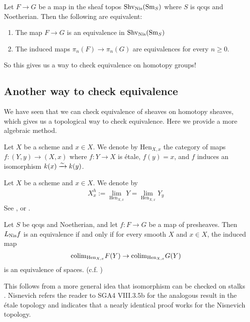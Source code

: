 \documentclass[11pt]{amsart}
\providecommand{\Hen}{\mathrm{Hen}}
\begin{document}
\begin{corollary} Let $F \to G$ be a map in the sheaf topos $\mathrm{Shv}_{\mathrm{Nis}}(\mathrm{Sm}_S)$ where $S$ is qcqs and Noetherian. Then the following are equivalent:
\begin{enumerate}
    \item The map $F \to G$ is an equivalence in $\mathrm{Shv}_{\mathrm{Nis}}(\mathrm{Sm}_S)$
    \item The induced maps $\pi_n(F) \to \pi_n(G)$ are equivalences for every $n\ge 0$.
\end{enumerate}
\end{corollary}

So this gives us a way to check equivalence on homotopy groups!

\subsection{Another way to check equivalence} We have seen that we can check equivalence of sheaves on homotopy sheaves, which gives us a topological way to check equivalence. Here we provide a more algebraic method.

\begin{notation} Let $X$ be a scheme and $x\in X$. We denote by $\Hen_{X,x}$ the category of maps $f \colon (Y,y) \to (X,x)$ where $f \colon Y \to X$ is \'etale, $f(y) = x$, and $f$ induces an isomorphism $k(x) \xrightarrow{\sim} k(y)$.
\end{notation}


\begin{definition} Let $X$ be a scheme and $x\in X$. We denote by 
\begin{align*}
    X_x^h := \lim_{\Hen_{X,x}} Y = \lim_{\Hen_{X,x}} Y_y
\end{align*}
See \cite[04GV]{Stacks}, or \cite[2.22]{Bachmann-K}.
\end{definition}


\begin{theorem} Let $S$ be qcqs and Noetherian, and let $f \colon F \to G$ be a map of presheaves. Then $L_{\mathrm{Nis}} f$ is an equivalence if and only if for every smooth $X$ and $x\in X$, the induced map
\begin{align*}
    \colim_{\Hen_{X,x}} F(Y) \to \colim_{\Hen_{X,x}} G(Y)
\end{align*}
is an equivalence of spaces. (c.f. \cite[2.23]{Bachmann-K})
\end{theorem}

This follows from a more general idea that isomorphism can be checked on stalks \cite[1.15]{Nisnevich}. Nisnevich refers the reader to SGA4 VIII.3.5b for the analogous result in the \'etale topology and indicates that a nearly identical proof works for the Nisnevich topology.

\printbibliography
\end{document}
